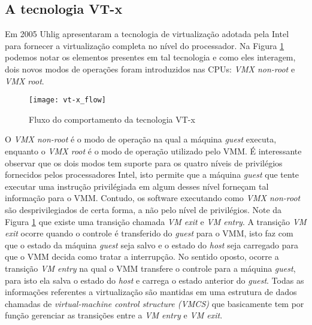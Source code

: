 
\subsection{A tecnologia VT-x}
\label{sec:vtx}

Em 2005 Uhlig \citep{uhlig} apresentaram a tecnologia de virtualização adotada
pela Intel para fornecer a virtualização completa no nível do processador. Na
Figura \ref{fig:vt-x_flow} podemos notar os elementos presentes em tal
tecnologia e como eles interagem, dois novos modos de operações foram
introduzidos nas CPUs: \emph{VMX non-root} e \emph{VMX root}.

\begin{figure}[!h]
  \centering
  \texttt{[image: vt-x\_flow]} 
  \caption{Fluxo do comportamento da tecnologia VT-x}
  \label{fig:vt-x_flow}
\end{figure}

O \emph{VMX non-root} é o modo de operação na qual a máquina \emph{guest}
executa, enquanto o \emph{VMX root} é o modo de operação utilizado pelo VMM. É
interessante observar que os dois modos tem suporte para os quatro níveis de
privilégios fornecidos pelos processadores Intel, isto permite que a máquina
\emph{guest} que tente executar uma instrução privilégiada em algum desses
nível forneçam tal informação para o VMM. Contudo, os software executando como
\emph{VMX non-root} são desprivilegiados de certa forma, a não pelo nível de
privilégios. Note da Figura \ref{fig:vt-x_flow} que existe uma transição chamada
\emph{VM exit} e \emph{VM entry}. A transição \emph{VM exit} ocorre quando o
controle é transferido do \emph{guest} para o VMM, isto faz com que o estado da
máquina \emph{guest} seja salvo e o estado do \emph{host} seja carregado para
que o VMM decida como tratar a interrupção. No sentido oposto, ocorre a
transição \emph{VM entry} na qual o VMM transfere o controle para a máquina
\emph{guest}, para isto ela salva o estado do \emph{host} e carrega o estado
anterior do \emph{guest}. Todas as informações referentes a virtualização são
mantidas em uma estrutura de dados chamadas de \emph{virtual-machine control
structure (VMCS)} que basicamente tem por função gerenciar as transições entre
a \emph{VM entry} e \emph{VM exit}.


